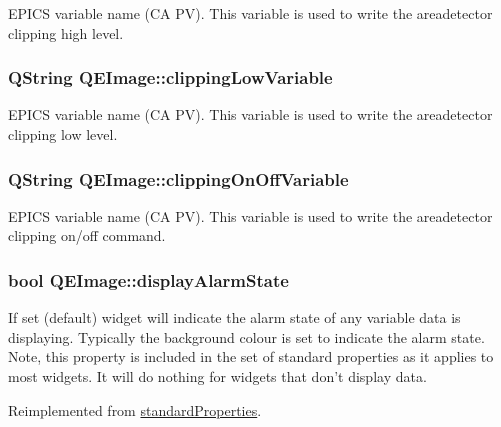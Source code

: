 \label{classQEImage_ac0aa101dc9f8ffdd2a39b4812372573b}
EPICS variable name (CA PV). This variable is used to write the areadetector clipping high level. \hypertarget{classQEImage_a12123766faf188fbf04d98de392bffd9}{
\subsubsection[{clippingLowVariable}]{\setlength{\rightskip}{0pt plus 5cm}QString QEImage::clippingLowVariable}}
\label{classQEImage_a12123766faf188fbf04d98de392bffd9}
EPICS variable name (CA PV). This variable is used to write the areadetector clipping low level. \hypertarget{classQEImage_aea0af2edf712740337565a76b08cb22e}{
\subsubsection[{clippingOnOffVariable}]{\setlength{\rightskip}{0pt plus 5cm}QString QEImage::clippingOnOffVariable}}
\label{classQEImage_aea0af2edf712740337565a76b08cb22e}
EPICS variable name (CA PV). This variable is used to write the areadetector clipping on/off command. \hypertarget{classQEImage_ac34bc84d987190c91bcf10767819c375}{
\subsubsection[{displayAlarmState}]{\setlength{\rightskip}{0pt plus 5cm}bool QEImage::displayAlarmState}}
\label{classQEImage_ac34bc84d987190c91bcf10767819c375}
If set (default) widget will indicate the alarm state of any variable data is displaying. Typically the background colour is set to indicate the alarm state. Note, this property is included in the set of standard properties as it applies to most widgets. It will do nothing for widgets that don't display data. 

Reimplemented from \hyperlink{classstandardProperties}{standardProperties}.

